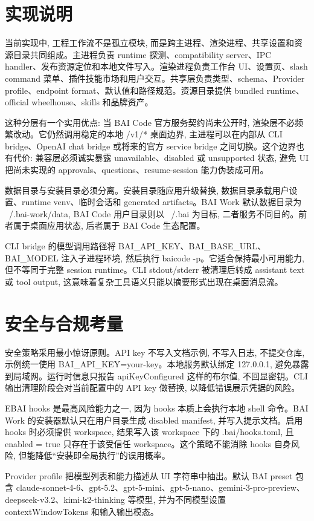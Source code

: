 \section{实现说明}
当前实现中, 工程工作流不是孤立模块, 而是跨主进程、渲染进程、共享设置和资源目录共同组成。主进程负责 runtime 探测、compatibility server、IPC handler、发布资源定位和本地文件写入。渲染进程负责工作台 UI、设置页、slash command 菜单、插件技能市场和用户交互。共享层负责类型、schema、Provider profile、endpoint format、默认值和路径规范。资源目录提供 bundled runtime、official wheelhouse、skills 和品牌资产。

这种分层有一个实用优点: 当 BAI Code 官方服务契约尚未公开时, 渲染层不必频繁改动。它仍然调用稳定的本地 /v1/* 桌面边界, 主进程可以在内部从 CLI bridge、OpenAI chat bridge 或将来的官方 service bridge 之间切换。这个边界也有代价: 兼容层必须诚实暴露 unavailable、disabled 或 unsupported 状态, 避免 UI 把尚未实现的 approvals、questions、resume-session 能力伪装成可用。

数据目录与安装目录必须分离。安装目录随应用升级替换, 数据目录承载用户设置、runtime venv、临时会话和 generated artifacts。BAI Work 默认数据目录为 ~/.bai-work/data, BAI Code 用户目录则以 ~/.bai 为目标, 二者服务不同目的。前者属于桌面应用状态, 后者属于 BAI Code 生态配置。

CLI bridge 的模型调用路径将 BAI\_API\_KEY、BAI\_BASE\_URL、BAI\_MODEL 注入子进程环境, 然后执行 baicode -p。它适合保持最小可用能力, 但不等同于完整 session runtime。CLI stdout/stderr 被清理后转成 assistant text 或 tool output, 这意味着复杂工具语义只能以摘要形式出现在桌面消息流。

\section{安全与合规考量}
安全策略采用最小惊讶原则。API key 不写入文档示例, 不写入日志, 不提交仓库, 示例统一使用 BAI\_API\_KEY=your-key。本地服务默认绑定 127.0.0.1, 避免暴露到局域网。运行时信息只报告 apiKeyConfigured 这样的布尔值, 不回显密钥。CLI 输出清理阶段会对当前配置中的 API key 做替换, 以降低错误展示凭据的风险。

EBAI hooks 是最高风险能力之一, 因为 hooks 本质上会执行本地 shell 命令。BAI Work 的安装器默认只在用户目录生成 disabled manifest, 并写入提示文档。启用 hooks 时必须提供 workspace, 结果写入该 workspace 下的 .bai/hooks.toml, 且 enabled = true 只存在于该受信任 workspace。这个策略不能消除 hooks 自身风险, 但能降低“安装即全局执行”的误用概率。

Provider profile 把模型列表和能力描述从 UI 字符串中抽出。默认 BAI preset 包含 claude-sonnet-4-6、gpt-5.2、gpt-5-mini、gpt-5-nano、gemini-3-pro-preview、deepseek-v3.2、kimi-k2-thinking 等模型, 并为不同模型设置 contextWindowTokens 和输入输出模态。

